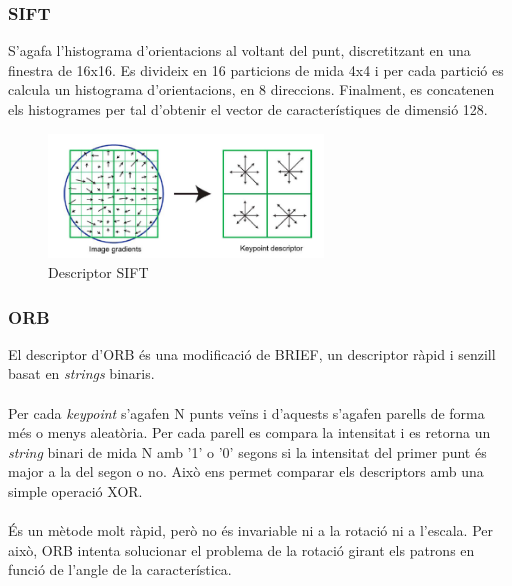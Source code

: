 	\subsubsection{SIFT}
	S'agafa l'histograma d'orientacions al voltant del punt, discretitzant en una finestra de 16x16.
	Es divideix en 16 particions de mida 4x4 i per cada partició es calcula un histograma d'orientacions, en 8 direccions.
	Finalment, es concatenen els histogrames per tal d'obtenir el vector de característiques de dimensió 128.
	\begin{figure}[H]
		\centering
		\includegraphics[width=0.65\textwidth]{images/sift-des}
		\caption{Descriptor SIFT}
	\end{figure}

	\subsubsection{ORB}
	El descriptor d'ORB és una modificació de BRIEF, un descriptor ràpid i senzill basat en \textit{strings} binaris.\\\\
	Per cada \textit{keypoint} s'agafen N punts veïns i d'aquests s'agafen parells de forma més o menys aleatòria. Per cada parell es compara la intensitat i es retorna un \textit{string} binari de mida N amb '1' o '0' segons
	si la intensitat del primer punt és major a la del segon o no. Això ens permet comparar els descriptors amb una simple operació XOR.\\\\
	És un mètode molt ràpid, però no és invariable ni a la rotació ni a l'escala. Per això, ORB intenta solucionar el problema de la rotació girant els patrons en funció de l'angle de la característica.

